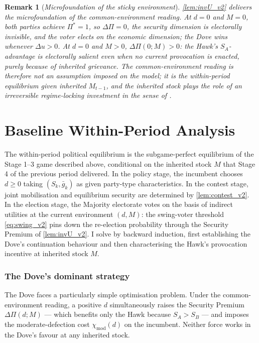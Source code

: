 \documentclass[11pt,twoside]{extarticle}
\newtheorem{remark}{Remark}
\begin{document}
\begin{remark}[\emph{Microfoundation of the sticky environment}]\label{rem:microfound_v2}
\autoref{lem:invU_v2} delivers the microfoundation of the common-environment reading. At $d=0$ and $M=0$, both parties achieve $\Pi^*=1$, so $\Delta\Pi=0$, the security dimension is electorally invisible, and the voter elects on the economic dimension; the Dove wins whenever $\Delta u>0$. At $d=0$ and $M>0$, $\Delta\Pi(0;M)>0$: the Hawk's $S_A$-advantage is electorally salient \emph{even when no current provocation is enacted}, purely because of inherited grievance. The common-environment reading is therefore not an assumption imposed on the model; it is the within-period equilibrium given inherited $M_{t-1}$, and the inherited stock plays the role of an irreversible regime-locking investment in the sense of \citet{coatePolicyPersistence1999}.
\end{remark}

\section{Baseline Within-Period Analysis}\label{sec:baseline_v2}

The within-period political equilibrium is the subgame-perfect equilibrium of the Stage 1--3 game described above, conditional on the inherited stock $M$ that Stage 4 of the previous period delivered. In the policy stage, the incumbent chooses $d\ge 0$ taking $(S_k,\bar g_k)$ as given party-type characteristics. In the contest stage, joint mobilisation and equilibrium security are determined by \autoref{lem:contest_v2}. In the election stage, the Majority electorate votes on the basis of indirect utilities at the current environment $(d,M)$: the swing-voter threshold \autoref{eq:swing_v2} pins down the re-election probability through the Security Premium of \autoref{lem:invU_v2}. I solve by backward induction, first establishing the Dove's continuation behaviour and then characterising the Hawk's provocation incentive at inherited stock $M$.

\subsubsection*{The Dove's dominant strategy}

The Dove faces a particularly simple optimisation problem. Under the common-environment reading, a positive $d$ simultaneously raises the Security Premium $\Delta\Pi(d;M)$ — which benefits only the Hawk because $S_A>S_B$ — and imposes the moderate-defection cost $\chi_{\mathrm{mod}}(d)$ on the incumbent. Neither force works in the Dove's favour at any inherited stock.
\end{document}

